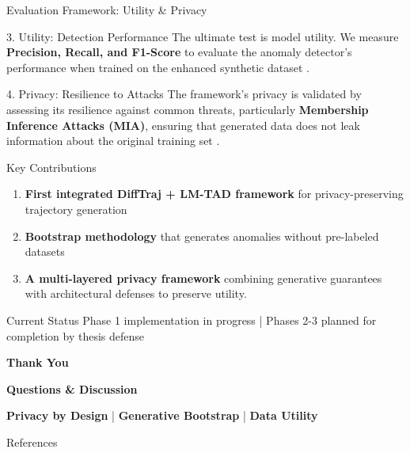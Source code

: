 \documentclass[aspectratio=169,xcolor={dvipsnames}]{beamer}
\begin{document}
\begin{frame}{Evaluation Framework: Utility \& Privacy}
    \begin{block}{3. Utility: Detection Performance}
        \small
        The ultimate test is model utility. We measure \textbf{Precision, Recall, and F1-Score} to evaluate the anomaly detector's performance when trained on the enhanced synthetic dataset \cite{mbuyaTrajectoryAnomalyDetection2024}.
    \end{block}

    \vspace{1em}
    
    \begin{alertblock}{4. Privacy: Resilience to Attacks}
        \small
        The framework's privacy is validated by assessing its resilience against common threats, particularly \textbf{Membership Inference Attacks (MIA)}, ensuring that generated data does not leak information about the original training set \cite{buchholzSystematisationKnowledgeTrajectory2024}.
    \end{alertblock}
\end{frame}

\begin{frame}{Key Contributions}
  \begin{block}{}
    \begin{enumerate}
      \item \textbf{First integrated DiffTraj + LM-TAD framework} for privacy-preserving trajectory generation
      \item \textbf{Bootstrap methodology} that generates anomalies without pre-labeled datasets
      \item \textbf{A multi-layered privacy framework} combining generative guarantees with architectural defenses to preserve utility.
    \end{enumerate}
  \end{block}
  
  \vspace{1em}
  \begin{alertblock}{Current Status}
    \centering
    Phase 1 implementation in progress | Phases 2-3 planned for completion by thesis defense
  \end{alertblock}
\end{frame}

\begin{frame}[plain]
  \centering
  \Huge \textbf{Thank You}
  
  \vspace{0.5em}
  \Large \textbf{Questions \& Discussion}
  
  \vspace{2em}
  \begin{block}{}
    \centering
    \textbf{Privacy by Design} | \textbf{Generative Bootstrap} | \textbf{Data Utility}
  \end{block}
\end{frame}

\begin{frame}[allowframebreaks]{References}
  \footnotesize
  \printbibliography[heading=none]
\end{frame}
\end{document}

